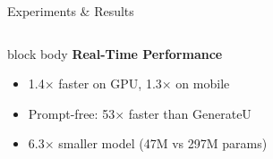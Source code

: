 \documentclass{beamer}
\begin{document}
\begin{frame}{Experiments \& Results}
\begin{columns}[T]
\begin{column}{0.52\textwidth}
            \vspace{0.1cm}
            
            \begin{beamercolorbox}[rounded=true,shadow=true,wd=\textwidth]{block body}
                \centering\textbf{Real-Time Performance}\vspace{-0.1cm}
                \begin{itemize}\small\setlength{\itemsep}{0pt}
                    \item \textcolor{ubburgundy}{1.4×} faster on GPU, \textcolor{ubburgundy}{1.3×} on mobile
                    \item Prompt-free: \textcolor{ubburgundy}{53×} faster than GenerateU
                    \item \textcolor{ubburgundy}{6.3×} smaller model (47M vs 297M params)
                \end{itemize}
            \end{beamercolorbox}
            
            \vspace{0.1cm}
            
        \end{column}
    \end{columns}
\end{frame}
\end{document}
